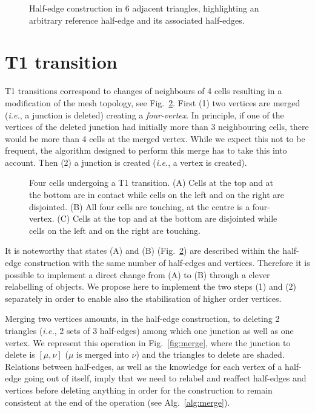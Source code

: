 \documentclass[aps, superscriptaddress, notitlepage]{revtex4-1}
\def\scale{0.8}
\begin{document}
\begin{figure}[!t]
\centering
\begin{tikzpicture}[scale=0.8*\scale]

\end{tikzpicture}
\caption{Half-edge construction in 6 adjacent triangles, highlighting an arbitrary reference half-edge and its associated half-edges.}
\label{fig:he}
\end{figure}

\section{T1 transition}

T1 transitions correspond to changes of neighbours of 4 cells resulting in a modification of the mesh topology, see Fig.~\ref{fig:t1}. First (1) two vertices are merged (\textit{i.e.}, a junction is deleted) creating a \textit{four-vertex}. In principle, if one of the vertices of the deleted junction had initially more than 3 neighbouring cells, there would be more than 4 cells at the merged vertex. While we expect this not to be frequent, the algorithm designed to perform this merge has to take this into account. Then (2) a junction is created (\textit{i.e.}, a vertex is created).

\begin{figure}[!b]
\centering
\begin{tikzpicture}[scale=0.25*\scale]

\end{tikzpicture}
\caption{Four cells undergoing a T1 transition. (A) Cells at the top and at the bottom are in contact while cells on the left and on the right are disjointed. (B) All four cells are touching, at the centre is a four-vertex. (C) Cells at the top and at the bottom are disjointed while cells on the left and on the right are touching.}
\label{fig:t1}
\end{figure}

It is noteworthy that states (A) and (B) (Fig.~\ref{fig:t1}) are described within the half-edge construction with the same number of half-edges and vertices. Therefore it is possible to implement a direct change from (A) to (B) through a clever relabelling of objects. We propose here to implement the two steps (1) and (2) separately in order to enable also the stabilisation of higher order vertices.

Merging two vertices amounts, in the half-edge construction, to deleting 2 triangles (\textit{i.e.}, 2 sets of 3 half-edges) among which one junction as well as one vertex. We represent this operation in Fig.~\ref{fig:merge}, where the junction to delete is $[\mu, \nu]$ ($\mu$ is merged into $\nu$) and the triangles to delete are shaded. Relations between half-edges, as well as the knowledge for each vertex of a half-edge going out of itself, imply that we need to relabel and reaffect half-edges and vertices before deleting anything in order for the construction to remain consistent at the end of the operation (see Alg.~\ref{alg:merge}).
\end{document}
